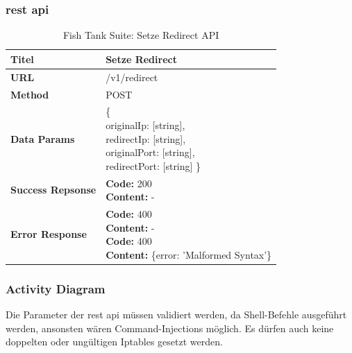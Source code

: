 \subsubsection{\gls{rest} \gls{api}}

\begin{table}[H]
    \centering
	\begin{tabularx}{\textwidth}{| l | X |}
        \hline
        \textbf{Titel} & Setze Redirect \\\hline        
        \textbf{URL} & /v1/redirect \\ \hline
        \textbf{Method} & POST\\ \hline
        \textbf{Data Params} & \pbox{30cm}{\vspace{3mm} \{\\originalIp: [string], \\ redirectIp: [string],\\ originalPort: [string],\\ redirectPort: [string] \} \vspace{3mm}}\\ \hline
        \textbf{Success Repsonse} & \pbox{30cm}{\vspace{3mm} \textbf{Code:} 200 \\ \textbf{Content:} - \vspace{3mm}}\\ \hline
        \textbf{Error Response} & \pbox{30cm}{\vspace{3mm} \textbf{Code:} 400 \\ \textbf{Content:} - \\
        \textbf{Code:} 400 \\ \textbf{Content:} \{error: 'Malformed Syntax'\} \vspace{3mm}}\\ \hline
    \end{tabularx}
    \caption{Fish Tank Suite: Setze Redirect API}
\end{table}


\subsubsection{Activity Diagram}
Die Parameter der \gls{rest} \gls{api} müssen validiert werden, da Shell-Befehle ausgeführt werden, ansonsten wären Command-Injections möglich. Es dürfen auch keine doppelten oder ungültigen Iptables gesetzt werden.

